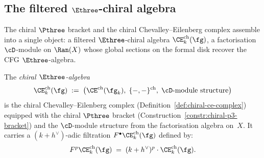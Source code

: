 \subsection{The filtered $\Ethree$-chiral algebra}
\label{subsec:filtered-e3-chiral}

The chiral $\Pthree$ bracket and the chiral
Chevalley--Eilenberg complex assemble into a single object:
a filtered $\Ethree$-chiral algebra
$\CE^{\mathrm{ch}}_k(\fg)$, a factorisation $\cD$-module
on $\Ran(X)$ whose global sections on the formal disk
recover the CFG $\Ethree$-algebra.

\begin{definition}
\label{def:filtered-e3-chiral}
The \emph{chiral $\Ethree$-algebra}
\begin{equation}\label{eq:chiral-e3-algebra}
  \CE^{\mathrm{ch}}_k(\fg)
  \;:=\;
  \bigl(\CE^{\mathrm{ch}}(\fg_k),\;
  \{-,-\}^{\mathrm{ch}},\;
  \cD\textrm{-module structure}\bigr)
\end{equation}
is the chiral Chevalley--Eilenberg complex
(Definition~\ref{def:chiral-ce-complex}) equipped with
the chiral $\Pthree$ bracket
(Construction~\ref{constr:chiral-p3-bracket}) and the
$\cD$-module structure from the factorisation algebra
on~$X$. It carries a $(k+h^\vee)$-adic filtration
$F^\bullet \CE^{\mathrm{ch}}_k(\fg)$ defined by:
\begin{equation}\label{eq:hbar-filtration}
  F^p \CE^{\mathrm{ch}}_k(\fg)
  \;=\;
  (k+h^\vee)^p \cdot \CE^{\mathrm{ch}}_k(\fg).
\end{equation}
\end{definition}

